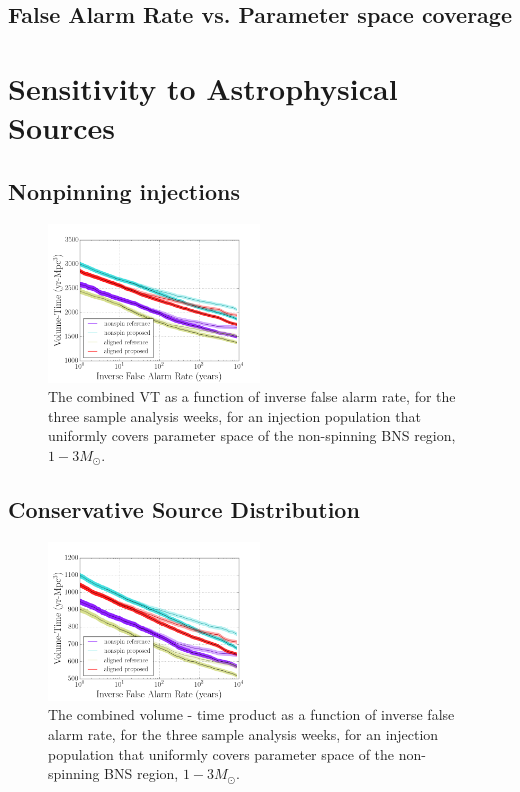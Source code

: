 \subsection{False Alarm Rate vs. Parameter space coverage}

\section{Sensitivity to Astrophysical Sources}
\subsection{Nonpinning injections}

\begin{figure}
\includegraphics[width=0.5\textwidth]{papers/bns_o1_dev/figures/ns_combined.png}
\caption{\label{fig:nonspin} 
The combined VT as a function of inverse false alarm rate, for the
three sample analysis weeks, for an injection population that uniformly covers parameter space of the non-spinning BNS region, $1- 3M_\odot$. 
}
\end{figure}

\subsection{Conservative Source Distribution}

\begin{figure}
\includegraphics[width=0.5\textwidth]{papers/bns_o1_dev/figures/rest_combined.png}
\caption{\label{fig:rest} 
The combined volume - time product as a function of inverse false alarm rate, for the
three sample analysis weeks, for an injection population that uniformly covers parameter space of the non-spinning BNS region, $1- 3M_\odot$. 
}
\end{figure}

